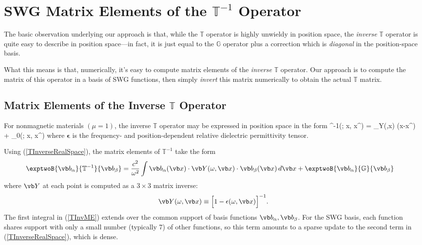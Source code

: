 \documentclass[letterpaper]{article}
\newcommand{\vbeps}{\boldsymbol{\epsilon}}
\begin{document}
\section{SWG Matrix Elements of the $\mathbb{T}^{-1}$ Operator}

The basic observation underlying our approach is that,
while the $\mathbb{T}$ operator is highly unwieldy in position space,
the \textit{inverse} $\mathbb{T}$ operator is quite easy to 
describe in position space---in fact, it is just equal to the 
$\mathbb{G}$ operator plus a correction which is \textit{diagonal}
in the position-space basis. 

What this means is that, numerically, it's easy to compute
matrix elements of the \textit{inverse} $\mathbb{T}$ operator.
Our approach is to compute the matrix of this operator in 
a basis of SWG functions,
then simply \textit{invert} this matrix numerically to obtain
the actual $\mathbb{T}$ matrix.

\subsection{Matrix Elements of the Inverse $\mathbb{T}$ Operator}

For nonmagnetic materials $(\mu=1)$, the inverse $\mathbb{T}$ operator 
may be expressed in position space in the form
{^{-1}(\omega; \vb x, \vb x^\prime)
   = 
    \underbrace{
    \Big[1-\vbeps(\omega, \vb x)\Big]^{-1}
               }_{\vb Y(\omega,\vb x)}
    \delta(\vb x-\vb x^\prime)
    + _0(\omega; \vb x, \vb x^\prime)
}
where $\vbeps$ is the frequency- and position-dependent relative
dielectric permittivity tensor.

Using (\ref{TInverseRealSpace}), the matrix elements of $\mathbb{T}^{-1}$
take the form
\begin{align}
  \exptwoB{\vb b_\alpha}{\mathbb{T}^{-1}}{\vb b_\beta}
&=
  \frac{c^2}{\omega^2}
  \int \vb b_\alpha(\vb x) \cdot \vb Y(\omega,\vb x) \cdot \vb b_\beta(\vb x)
  \, d\vb x
  +
  \exptwoB{\vb b_\alpha}{\mathbb{G}}{\vb b_\beta}
\label{TInvME}
\end{align}
where $\vb Y$ at each point is computed as a $3\times 3$ matrix 
inverse:
$$\vb Y(\omega,\vb x) \equiv \Big[1 - \epsilon(\omega,\vb x)\Big]^{-1}.$$
The first integral in (\ref{TInvME}) extends over the common support of 
basis functions $\vb b_\alpha,\vb b_\beta$. For the SWG basis, each 
function shares support with only a small number (typically 7) of other 
functions, so this term amounts to a sparse update to the second term in 
(\ref{TInverseRealSpace}), which is dense.
\end{document}
